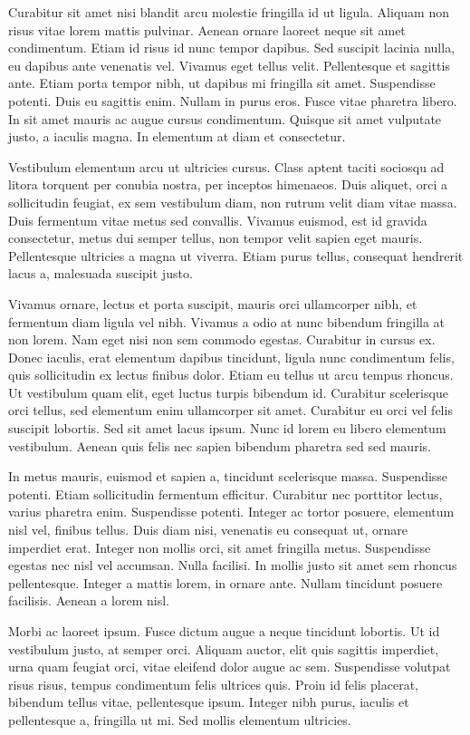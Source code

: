 \documentclass{article}
\begin{document}
Curabitur sit amet nisi blandit arcu molestie fringilla id ut ligula. Aliquam non risus vitae lorem mattis pulvinar. Aenean ornare laoreet neque sit amet condimentum. Etiam id risus id nunc tempor dapibus. Sed suscipit lacinia nulla, eu dapibus ante venenatis vel. Vivamus eget tellus velit. Pellentesque et sagittis ante. Etiam porta tempor nibh, ut dapibus mi fringilla sit amet. Suspendisse potenti. Duis eu sagittis enim. Nullam in purus eros. Fusce vitae pharetra libero. In sit amet mauris ac augue cursus condimentum. Quisque sit amet vulputate justo, a iaculis magna. In elementum at diam et consectetur.

Vestibulum elementum arcu ut ultricies cursus. Class aptent taciti sociosqu ad litora torquent per conubia nostra, per inceptos himenaeos. Duis aliquet, orci a sollicitudin feugiat, ex sem vestibulum diam, non rutrum velit diam vitae massa. Duis fermentum vitae metus sed convallis. Vivamus euismod, est id gravida consectetur, metus dui semper tellus, non tempor velit sapien eget mauris. Pellentesque ultricies a magna ut viverra. Etiam purus tellus, consequat hendrerit lacus a, malesuada suscipit justo.

Vivamus ornare, lectus et porta suscipit, mauris orci ullamcorper nibh, et fermentum diam ligula vel nibh. Vivamus a odio at nunc bibendum fringilla at non lorem. Nam eget nisi non sem commodo egestas. Curabitur in cursus ex. Donec iaculis, erat elementum dapibus tincidunt, ligula nunc condimentum felis, quis sollicitudin ex lectus finibus dolor. Etiam eu tellus ut arcu tempus rhoncus. Ut vestibulum quam elit, eget luctus turpis bibendum id. Curabitur scelerisque orci tellus, sed elementum enim ullamcorper sit amet. Curabitur eu orci vel felis suscipit lobortis. Sed sit amet lacus ipsum. Nunc id lorem eu libero elementum vestibulum. Aenean quis felis nec sapien bibendum pharetra sed sed mauris.

In metus mauris, euismod et sapien a, tincidunt scelerisque massa. Suspendisse potenti. Etiam sollicitudin fermentum efficitur. Curabitur nec porttitor lectus, varius pharetra enim. Suspendisse potenti. Integer ac tortor posuere, elementum nisl vel, finibus tellus. Duis diam nisi, venenatis eu consequat ut, ornare imperdiet erat. Integer non mollis orci, sit amet fringilla metus. Suspendisse egestas nec nisl vel accumsan. Nulla facilisi. In mollis justo sit amet sem rhoncus pellentesque. Integer a mattis lorem, in ornare ante. Nullam tincidunt posuere facilisis. Aenean a lorem nisl.

Morbi ac laoreet ipsum. Fusce dictum augue a neque tincidunt lobortis. Ut id vestibulum justo, at semper orci. Aliquam auctor, elit quis sagittis imperdiet, urna quam feugiat orci, vitae eleifend dolor augue ac sem. Suspendisse volutpat risus risus, tempus condimentum felis ultrices quis. Proin id felis placerat, bibendum tellus vitae, pellentesque ipsum. Integer nibh purus, iaculis et pellentesque a, fringilla ut mi. Sed mollis elementum ultricies.
\end{document}
